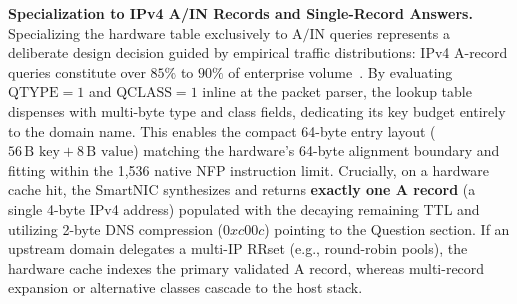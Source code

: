 \documentclass[a4paper,fleqn,colorlinks,hidelinks]{cas-sc}
\begin{document}
\textbf{Specialization to IPv4 A/IN Records and Single-Record Answers.} Specializing the hardware table exclusively to $\text{A}/\text{IN}$ queries represents a deliberate design decision guided by empirical traffic distributions: IPv4 A-record queries constitute over $85\%$ to $90\%$ of enterprise volume~\cite{SINGH201914}. By evaluating $\text{QTYPE}=1$ and $\text{QCLASS}=1$ inline at the packet parser, the lookup table dispenses with multi-byte type and class fields, dedicating its key budget entirely to the domain name. This enables the compact 64-byte entry layout ($56\,\text{B}\text{ key} + 8\,\text{B}\text{ value}$) matching the hardware's 64-byte alignment boundary and fitting within the 1,536 native NFP instruction limit. Crucially, on a hardware cache hit, the SmartNIC synthesizes and returns \textbf{exactly one A record} (a single 4-byte IPv4 address) populated with the decaying remaining TTL and utilizing 2-byte DNS compression ($0xc00c$) pointing to the Question section. If an upstream domain delegates a multi-IP RRset (e.g., round-robin pools), the hardware cache indexes the primary validated A record, whereas multi-record expansion or alternative classes cascade to the host stack.
\end{document}
